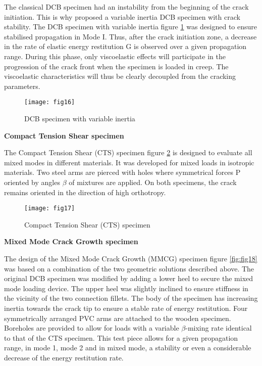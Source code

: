 The classical DCB specimen had an instability from the beginning of the crack initiation. This is why \cite{Reference17} proposed a variable inertia DCB specimen with crack stability. The DCB specimen with variable inertia figure \ref{fig:fig16} was designed to ensure stabilised propagation in Mode I. Thus, after the crack initiation zone, a decrease in the rate of elastic energy restitution G is observed over a given propagation range. During this phase, only viscoelastic effects will participate in the progression of the crack front when the specimen is loaded in creep. The viscoelastic characteristics will thus be clearly decoupled from the cracking parameters. 

\graphicspath{{Images/}}
\begin{figure}[htp]
	\centering
	\texttt{[image: fig16]}
	\caption{DCB specimen with variable inertia \cite{Reference17}}
	\label{fig:fig16}
\end{figure}

\smallskip

\textbf{Compact Tension Shear specimen}

The Compact Tension Shear (CTS) specimen figure \ref{fig:fig17} is designed to evaluate all mixed modes in different materials. It was developed for mixed loads in isotropic materials. Two steel arms are pierced with holes where symmetrical forces P oriented by angles $\beta$ of mixtures are applied. On both specimens, the crack remains oriented in the direction of high orthotropy.

\graphicspath{{Images/}}
\begin{figure}[htp]
	\centering
	\texttt{[image: fig17]}
	\caption{Compact Tension Shear (CTS) specimen}
	\label{fig:fig17}
\end{figure}


\textbf{Mixed Mode Crack Growth specimen}

The design of the Mixed Mode Crack Growth (MMCG) specimen figure \ref{fig:fig18} was based on a combination of the two geometric solutions described above. The original DCB specimen was modified by adding a lower heel to secure the mixed mode loading device. The upper heel was slightly inclined to ensure stiffness in the vicinity of the two connection fillets. The body of the specimen has increasing inertia towards the crack tip to ensure a stable rate of energy restitution. Four symmetrically arranged PVC arms are attached to the wooden specimen. Boreholes are provided to allow for loads with a variable $\beta$-mixing rate identical to that of the CTS specimen. This test piece allows for a given propagation range, in mode 1, mode 2 and in mixed mode, a stability or even a considerable decrease of the energy restitution rate\cite{Reference8}.

